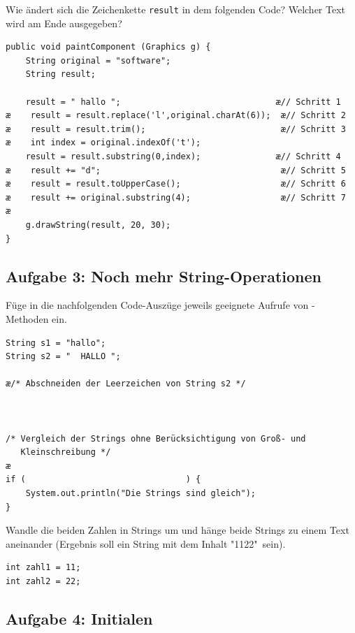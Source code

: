 Wie ändert sich die Zeichenkette \lstinline|result| in dem folgenden Code?
Welcher Text wird am Ende ausgegeben?

\begin{lstlisting}
public void paintComponent (Graphics g) {
    String original = "software";
    String result;

    result = " hallo ";                               æ// Schritt 1
æ    result = result.replace('l',original.charAt(6));  æ// Schritt 2
æ    result = result.trim();                           æ// Schritt 3
æ    int index = original.indexOf('t');
    result = result.substring(0,index);               æ// Schritt 4
æ    result += "d";                                    æ// Schritt 5
æ    result = result.toUpperCase();                    æ// Schritt 6
æ    result += original.substring(4);                  æ// Schritt 7
æ
    g.drawString(result, 20, 30);
}
\end{lstlisting}


\subsection{Aufgabe 3: Noch mehr String-Operationen}

Füge in die nachfolgenden Code-Auszüge jeweils geeignete Aufrufe von
-Methoden ein.

\begin{compactenum}[a)]
\item
\begin{lstlisting}
String s1 = "hallo";
String s2 = "  HALLO ";

æ/* Abschneiden der Leerzeichen von String s2 */



/* Vergleich der Strings ohne Berücksichtigung von Groß- und    
   Kleinschreibung */
æ
if (								) {
    System.out.println("Die Strings sind gleich");
}
\end{lstlisting}

\item Wandle die beiden Zahlen in Strings um und hänge beide Strings zu
einem Text aneinander (Ergebnis soll ein String mit dem Inhalt "1122"\ sein). 
\begin{lstlisting}
int zahl1 = 11;
int zahl2 = 22;
\end{lstlisting}
\end{compactenum}


\subsection{Aufgabe 4: Initialen}

